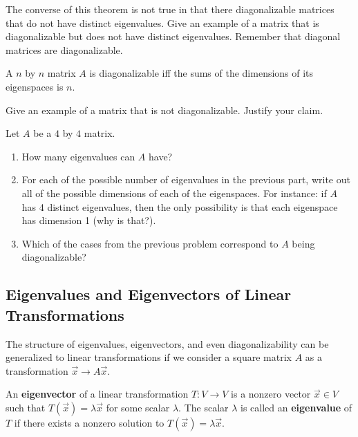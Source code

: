 \bq The converse of this theorem is not true in that there diagonalizable matrices that do not have distinct eigenvalues. Give an example of a matrix that is diagonalizable but does not have distinct eigenvalues. Remember that diagonal matrices are diagonalizable. \eq

\begin{theorem}
A $n$ by $n$ matrix $A$ is diagonalizable iff the sums of the dimensions of its eigenspaces is $n$.
\end{theorem}

\bq Give an example of a matrix that is not diagonalizable. Justify your claim.
\eq

\bq Let $A$ be a $4$ by $4$ matrix. \begin{enumerate} \item How many eigenvalues can $A$ have?
\item For each of the possible number of eigenvalues in the previous part, write out all of the possible dimensions of each of the eigenspaces. For instance: if $A$ has 4 distinct eigenvalues, then the only possibility is that each eigenspace has dimension 1 (why is that?).
\item Which of the cases from the previous problem correspond to $A$ being diagonalizable?
\end{enumerate}
\eq
\subsection{Eigenvalues and Eigenvectors of Linear Transformations}
The structure of eigenvalues, eigenvectors, and even diagonalizability can be generalized to linear transformations if we consider a square matrix $A$ as a transformation $\vec{x} \rightarrow A\vec{x}$.

\begin{definition}
An \textbf{eigenvector} of a linear transformation $T:V \rightarrow V$ is a nonzero vector $\vec{x} \in V$ such that $T(\vec{x})=\lambda \vec{x}$ for some scalar $\lambda$. The scalar $\lambda$ is called an \textbf{eigenvalue} of $T$ if there exists a nonzero solution to $T(\vec{x}) = \lambda \vec{x}$.
\end{definition}

